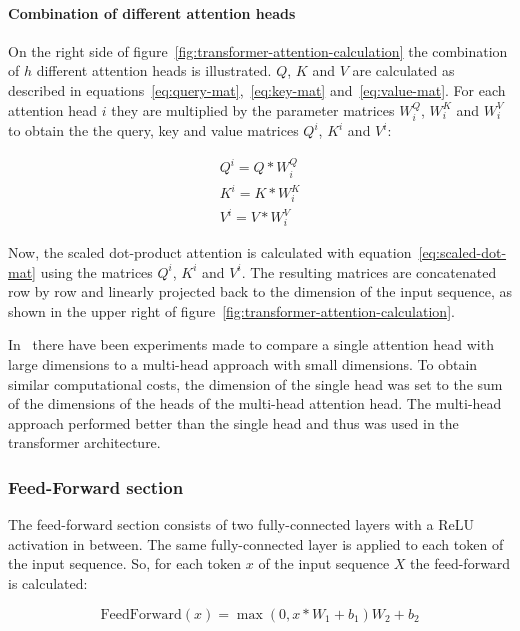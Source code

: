 \documentclass[a4paper]{scrartcl}
\begin{document}
    \paragraph{Combination of different attention heads}
    On the right side of figure~\ref{fig:transformer-attention-calculation} the combination of $h$ different attention heads is illustrated.
    $Q$, $K$ and $V$ are calculated as described in equations~\ref{eq:query-mat},~\ref{eq:key-mat} and~\ref{eq:value-mat}.
    For each attention head $i$ they are multiplied by the parameter matrices $W^Q_i$, $W^K_i$ and $W^V_i$ to obtain the the query, key and value matrices $Q^i$, $K^i$ and $V^i$:

    \begin{gather}
        Q^i = Q * W^Q_i \\
        K^i = K * W^K_i \\
        V^i = V * W^V_i
    \end{gather}

    Now, the scaled dot-product attention is calculated with equation~\ref{eq:scaled-dot-mat} using the matrices $Q^i$, $K^i$ and $V^i$.
    The resulting matrices are concatenated row by row and linearly projected back to the dimension of the input sequence, as shown in the upper right of figure~\ref{fig:transformer-attention-calculation}.

    In~\cite{vaswani2017attention} there have been experiments made to compare a single attention head with large dimensions to a multi-head approach with small dimensions.
    To obtain similar computational costs, the dimension of the single head was set to the sum of the dimensions of the heads of the multi-head attention head.
    The multi-head approach performed better than the single head and thus was used in the transformer architecture.

    \subsubsection{Feed-Forward section}\label{subsubsec:feed-forward-section}
    The feed-forward section consists of two fully-connected layers with a ReLU activation in between.
    The same fully-connected layer is applied to each token of the input sequence.
    So, for each token $x$ of the input sequence $X$ the feed-forward is calculated:

    \begin{equation}
        \text{FeedForward}(x) = \max(0, x * W_1 + b_1)W_2 + b_2\label{eq:feed-forward}
    \end{equation}
\end{document}
